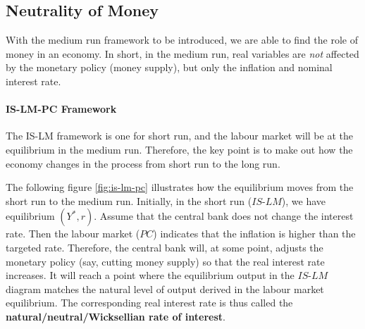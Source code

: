 \documentclass[12pt]{article}
\begin{document}
\subsection*{Neutrality of Money}
With the medium run framework to be introduced, we are able to find the role of money in an economy. In short, in the medium run, real variables are \textit{not} affected by the monetary policy (money supply), but only the inflation and nominal interest rate. 

\paragraph{IS-LM-PC Framework}
The IS-LM framework is one for short run, and the labour market will be at the equilibrium in the medium run. Therefore, the key point is to make out how the economy changes in the process from short run to the long run.

The following figure \ref{fig:is-lm-pc} illustrates how the equilibrium moves from the short run to the medium run. Initially, in the short run ($IS$-$LM$), we have equilibrium $(Y^*, r)$. Assume that the central bank does not change the interest rate. Then the labour market ($PC$) indicates that the inflation is higher than the targeted rate. Therefore, the central bank will, at some point, adjusts the monetary policy (say, cutting money supply) so that the real interest rate increases. It will reach a point where the equilibrium output in the $IS$-$LM$ diagram matches the natural level of output derived in the labour market equilibrium. The corresponding real interest rate is thus called the \textbf{natural/neutral/Wicksellian rate of interest}.
\end{document}
